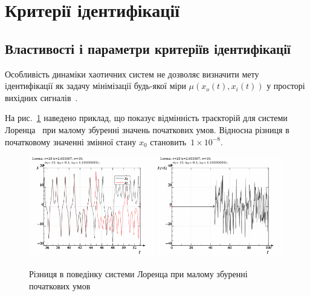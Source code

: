 
\section{Критерії ідентифікації} %

\subsection{Властивості і параметри критеріїв ідентифікації} %

Особливість динаміки хаотичних систем не дозволяє визначити мету ідентифікації
як задачу мінімізації будь-якої міри
$\mu(x_o(t), x_i(t))$ у просторі вихідних
сигналів~\cite{atu_asau11,atu_asau12,atu_asau14,atu_electronika2013}.


На рис.~\ref{atu:f:lor_diff_x0} наведено приклад, що показує відмінність
траєкторій для системи Лоренца~\cite{moon_chaotic_vibr} при малому збуренні
значень початкових умов. Відносна різниця в початковому
значенні змінної стану
$x_0$ становить~$1 \times 10^{-8}$.

\begin{figure}[htb!]
  \begin{center}
    \includegraphics[width=0.49\textwidth]{p/lor_diff-p_xx_x0.png}
    \hfill
    \includegraphics[width=0.49\textwidth]{p/lor_diff-p_dx_x0.png}
  \end{center}
\caption{Різниця в поведінку системи Лоренца при малому збуренні початкових умов}
\label{atu:f:lor_diff_x0}
\end{figure}


